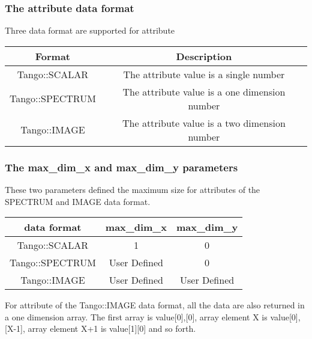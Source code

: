 \subsubsection{The attribute data format}

Three data format are supported for attribute

\vspace{0.3cm}


\begin{center}
\begin{longtable}{|c|c|}
\hline 
Format & Description\tabularnewline
\hline 
\hline 
Tango::SCALAR\index{SCALAR} & The attribute value is a single number\tabularnewline
\hline 
Tango::SPECTRUM\index{SPECTRUM} & The attribute value is a one dimension number\tabularnewline
\hline 
Tango::IMAGE\index{IMAGE} & The attribute value is a two dimension number\tabularnewline
\hline 
\end{longtable}
\par\end{center}

\vspace{0.3cm}



\subsubsection{The max\_dim\_x and max\_dim\_y
parameters}

These two parameters defined the maximum size for attributes of the
SPECTRUM and IMAGE data format.

\vspace{0.3cm}


\begin{center}
\begin{longtable}{|c|c|c|}
\hline 
data format & max\_dim\_x & max\_dim\_y\tabularnewline
\hline 
\hline 
Tango::SCALAR & 1 & 0\tabularnewline
\hline 
Tango::SPECTRUM & User Defined & 0\tabularnewline
\hline 
Tango::IMAGE & User Defined & User Defined\tabularnewline
\hline 
\end{longtable}
\par\end{center}

\vspace{0.3cm}


For attribute of the Tango::IMAGE data format, all the data are also
returned in a one dimension array. The first array is value{[}0{]},{[}0{]},
array element X is value{[}0{]},{[}X-1{]}, array element X+1 is value{[}1{]}{[}0{]}
and so forth.


